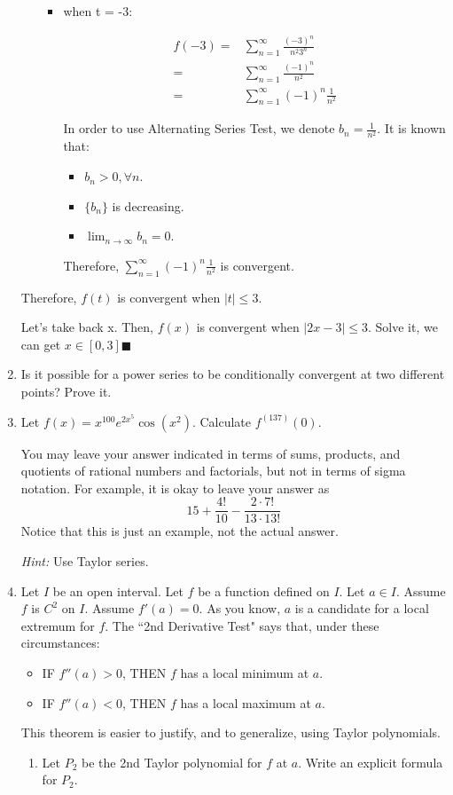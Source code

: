 \documentclass[12pt]{exam}
\newcommand {\DS} [1] {${\displaystyle #1}$}
\begin{document}
\begin{enumerate}
\begin{itemize}
\begin{itemize}
		\item when t = -3:

		\begin{align*}
			f(-3) 
			=& \sum_{n = 1}^{\infty} \frac{(-3)^n}{n^2 3^n} \\
			=& \sum_{n = 1}^{\infty} \frac{(-1)^n}{n^2} \\
			=& \sum_{n = 1}^{\infty} (-1)^n \frac{1}{n^2}
		\end{align*}

		In order to use Alternating Series Test, we denote $b_n = \frac{1}{n^2}$. It is known that:
		\begin{itemize}
			\item $b_n > 0, \forall n$.
			\item $\{b_n\}$ is decreasing.
			\item $\lim_{n \to \infty} b_n = 0$.
		\end{itemize}

		Therefore, $\sum_{n = 1}^{\infty} (-1)^n \frac{1}{n^2}$ is convergent.
	\end{itemize}
\end{itemize}

Therefore, $f(t)$ is convergent when $|t| \leq 3$.

Let's take back x. Then, $f(x)$ is convergent when $|2x - 3| \leq 3$. Solve it, we can get $x \in [0, 3] \blacksquare$

\newpage

\item Is it possible for a power series to be conditionally convergent at two different points?  Prove it.

\item Let \DS{f(x) = x^{100} e^{2x^5} \cos ( x^2) }.  Calculate \DS{f^{(137)}(0)}.   

You may leave your answer indicated in terms of sums, products, and quotients of rational numbers and factorials, but not in terms of sigma notation.  For example, it is okay to leave your answer as
	$$
		 15 + \frac{4!}{10} - \frac{2 \cdot 7!}{13 \cdot 13!}
	$$ 
Notice that this is just an example, not the actual answer.	

\emph{Hint:}  Use Taylor series.  


\item  Let $I$ be an open interval.    Let $f$ be a function defined on $I$.  Let $a \in I$.  Assume $f$ is $C^2$ on $I$.   Assume $f'(a) = 0$.   As you know, $a$ is a candidate for a local extremum for $f$.  The ``2nd Derivative Test" says that, under these circumstances:
	\begin{itemize}
		\item  IF $f''(a)>0$, THEN $f$ has a local minimum at $a$.
		\item  IF $f''(a)<0$, THEN $f$ has a local maximum at $a$.
	\end{itemize}
	 This theorem is easier to justify, and to generalize, using Taylor polynomials.
	\begin{enumerate}
		\item  \label{qu:int} Let $P_2$ be the 2nd Taylor polynomial for $f$ at $a$.  Write an explicit formula for $P_2$.
		

\end{enumerate}
\end{enumerate}
\end{document}
